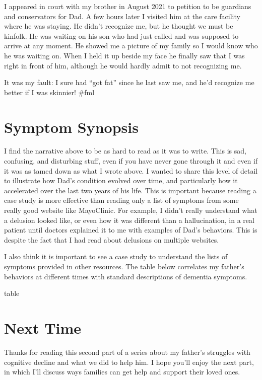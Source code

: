 \documentclass{article}
\begin{document}
I appeared in court with my brother in August 2021 to petition to be guardians and conservators for Dad. A few hours later I visited him at the care facility where he was staying. He didn't recognize me, but he thought we must be kinfolk. He was waiting on his son who had just called and was supposed to arrive at any moment. He showed me a picture of my family so I would know who he was waiting on. When I held it up beside my face he finally saw that I was right in front of him, although he would hardly admit to not recognizing me. 

It was my fault: I sure had ``got fat'' since he last saw me, and he'd recognize me better if I was skinnier! \#fml

\section*{Symptom Synopsis}

I find the narrative above to be as hard to read as it was to write. This is sad, confusing, and disturbing stuff, even if you have never gone through it and even if it was as tamed down as what I wrote above. I wanted to share this level of detail to illustrate how Dad's condition evolved over time, and particularly how it accelerated over the last two years of his life. This is important because reading a case study is more effective than reading only a list of symptoms from some really good website like MayoClinic. For example, I didn't really understand what a delusion looked like, or even how it was different than a hallucination, in a real patient until doctors explained it to me with examples of Dad's behaviors. This is despite the fact that I had read about delusions on multiple websites.


I also think it is important to see a case study to understand the lists of symptoms provided in other resources.  The table below correlates my father's behaviors at different times with standard descriptions of dementia symptoms. 

table

\section*{Next Time}

Thanks for reading this second part of a series about my father’s struggles with cognitive decline and what we did to help him. I hope you’ll enjoy the next part, in which I'll discuss ways families can get help and support their loved ones.
\end{document}
